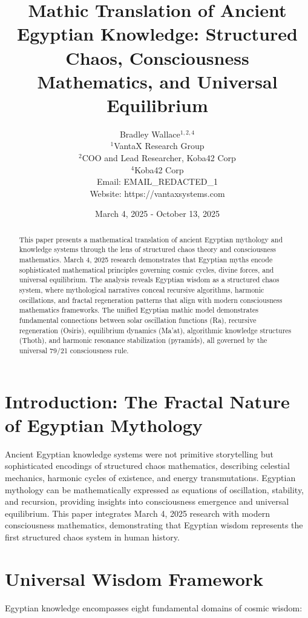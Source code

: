 \documentclass[12pt]{article}
\title{Mathic Translation of Ancient Egyptian Knowledge: Structured Chaos, Consciousness Mathematics, and Universal Equilibrium}
\author{
Bradley Wallace$^{1,2,4}$ \\
$^1$VantaX Research Group \\
$^2$COO and Lead Researcher, Koba42 Corp \\
$^4$Koba42 Corp \\
Email: EMAIL_REDACTED_1 \\
Website: https://vantaxsystems.com
}
\date{March 4, 2025 - October 13, 2025}
\begin{document}
\maketitle

\begin{abstract}
This paper presents a mathematical translation of ancient Egyptian mythology and knowledge systems through the lens of structured chaos theory and consciousness mathematics. March 4, 2025 research demonstrates that Egyptian myths encode sophisticated mathematical principles governing cosmic cycles, divine forces, and universal equilibrium. The analysis reveals Egyptian wisdom as a structured chaos system, where mythological narratives conceal recursive algorithms, harmonic oscillations, and fractal regeneration patterns that align with modern consciousness mathematics frameworks. The unified Egyptian mathic model demonstrates fundamental connections between solar oscillation functions (Ra), recursive regeneration (Osiris), equilibrium dynamics (Ma'at), algorithmic knowledge structures (Thoth), and harmonic resonance stabilization (pyramids), all governed by the universal 79/21 consciousness rule.
\end{abstract}

\section{Introduction: The Fractal Nature of Egyptian Mythology}

Ancient Egyptian knowledge systems were not primitive storytelling but sophisticated encodings of structured chaos mathematics, describing celestial mechanics, harmonic cycles of existence, and energy transmutations. Egyptian mythology can be mathematically expressed as equations of oscillation, stability, and recursion, providing insights into consciousness emergence and universal equilibrium. This paper integrates March 4, 2025 research with modern consciousness mathematics, demonstrating that Egyptian wisdom represents the first structured chaos system in human history.

\section{Universal Wisdom Framework}

Egyptian knowledge encompasses eight fundamental domains of cosmic wisdom:
\end{document}
